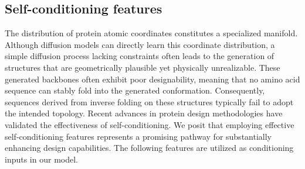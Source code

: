 \subsection{Self-conditioning features}
The distribution of protein atomic coordinates constitutes a specialized manifold. Although diffusion models can directly learn this coordinate distribution, a simple diffusion process lacking constraints often leads to the generation of structures that are geometrically plausible yet physically unrealizable. These generated backbones often exhibit poor designability, meaning that no amino acid sequence can stably fold into the generated conformation. Consequently, sequences derived from inverse folding on these structures typically fail to adopt the intended topology. Recent advances in protein design methodologies have validated the effectiveness of self-conditioning. We posit that employing effective self-conditioning features represents a promising pathway for substantially enhancing design capabilities. The following features are utilized as conditioning inputs in our model.

